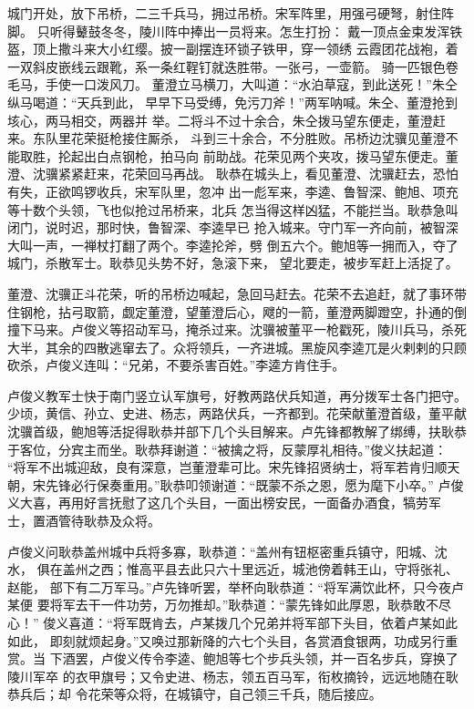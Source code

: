 城门开处，放下吊桥，二三千兵马，拥过吊桥。宋军阵里，用强弓硬弩，射住阵脚。
只听得鼙鼓冬冬，陵川阵中捧出一员将来。怎生打扮：
戴一顶点金束发浑铁盔，顶上撒斗来大小红缨。披一副摆连环锁子铁甲，穿一领绣
云霞团花战袍，着一双斜皮嵌线云跟靴，系一条红鞓钉就迭胜带。一张弓，一壶箭。
骑一匹银色卷毛马，手使一口泼风刀。
董澄立马横刀，大叫道：“水泊草寇，到此送死！”朱仝纵马喝道：“天兵到此，
早早下马受缚，免污刀斧！”两军呐喊。朱仝、董澄抢到垓心，两马相交，两器并
举。二将斗不过十余合，朱仝拨马望东便走，董澄赶来。东队里花荣挺枪接住厮杀，
斗到三十余合，不分胜败。吊桥边沈骥见董澄不能取胜，抡起出白点钢枪，拍马向
前助战。花荣见两个夹攻，拨马望东便走。董澄、沈骥紧紧赶来，花荣回马再战。
耿恭在城头上，看见董澄、沈骥赶去，恐怕有失，正欲鸣锣收兵，宋军队里，忽冲
出一彪军来，李逵、鲁智深、鲍旭、项充等十数个头领，飞也似抢过吊桥来，北兵
怎当得这样凶猛，不能拦当。耿恭急叫闭门，说时迟，那时快，鲁智深、李逵早已
抢入城来。守门军一齐向前，被智深大叫一声，一禅杖打翻了两个。李逵抡斧，劈
倒五六个。鲍旭等一拥而入，夺了城门，杀散军士。耿恭见头势不好，急滚下来，
望北要走，被步军赶上活捉了。

董澄、沈骥正斗花荣，听的吊桥边喊起，急回马赶去。花荣不去追赶，就了事环带
住钢枪，拈弓取箭，觑定董澄，望董澄后心，飕的一箭，董澄两脚蹬空，扑通的倒
撞下马来。卢俊义等招动军马，掩杀过来。沈骥被董平一枪戳死，陵川兵马，杀死
大半，其余的四散逃窜去了。众将领兵，一齐进城。黑旋风李逵兀是火剌剌的只顾
砍杀，卢俊义连叫：“兄弟，不要杀害百姓。”李逵方肯住手。

卢俊义教军士快于南门竖立认军旗号，好教两路伏兵知道，再分拨军士各门把守。
少顷，黄信、孙立、史进、杨志，两路伏兵，一齐都到。花荣献董澄首级，董平献
沈骥首级，鲍旭等活捉得耿恭并部下几个头目解来。卢先锋都教解了绑缚，扶耿恭
于客位，分宾主而坐。耿恭拜谢道：“被擒之将，反蒙厚礼相待。”俊义扶起道：
“将军不出城迎敌，良有深意，岂董澄辈可比。宋先锋招贤纳士，将军若肯归顺天
朝，宋先锋必行保奏重用。”耿恭叩领谢道：“既蒙不杀之恩，愿为麾下小卒。”
卢俊义大喜，再用好言抚慰了这几个头目，一面出榜安民，一面备办酒食，犒劳军
士，置酒管待耿恭及众将。

卢俊义问耿恭盖州城中兵将多寡，耿恭道：“盖州有钮枢密重兵镇守，阳城、沈水，
俱在盖州之西；惟高平县去此只六十里远近，城池傍着韩王山，守将张礼、赵能，
部下有二万军马。”卢先锋听罢，举杯向耿恭道：“将军满饮此杯，只今夜卢某便
要将军去干一件功劳，万勿推却。”耿恭道：“蒙先锋如此厚恩，耿恭敢不尽心！”
俊义喜道：“将军既肯去，卢某拨几个兄弟并将军部下头目，依着卢某如此如此，
即刻就烦起身。”又唤过那新降的六七个头目，各赏酒食银两，功成另行重赏。当
下酒罢，卢俊义传令李逵、鲍旭等七个步兵头领，并一百名步兵，穿换了陵川军卒
的衣甲旗号；又令史进、杨志，领五百马军，衔枚摘铃，远远地随在耿恭兵后；却
令花荣等众将，在城镇守，自己领三千兵，随后接应。


